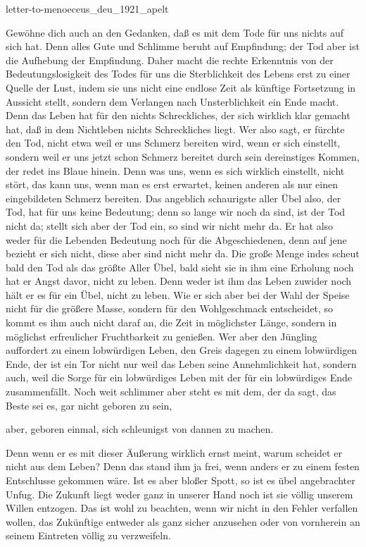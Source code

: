 \documentclass{stex}
\begin{document}
\begin{smodule}{letter-to-menoeceus_deu_1921_apelt}
\begin{sparagraph}[id=letter-to-menoeceus,name=Letter to Menoeceus]
  Gewöhne dich auch an den Gedanken, daß es mit dem Tode für uns nichts auf sich hat.
  Denn alles Gute und Schlimme beruht auf Empfindung; der Tod aber ist die Aufhebung der Empfindung.
  Daher macht die rechte Erkenntnis von der Bedeutungslosigkeit des Todes für uns die Sterblichkeit des Lebens erst zu einer Quelle der Lust, indem sie uns nicht eine endlose Zeit als künftige Fortsetzung in Aussicht stellt, sondern dem Verlangen nach Unsterblichkeit ein Ende macht.
  Denn das Leben hat für den nichts Schreckliches, der sich wirklich klar gemacht hat, daß in dem Nichtleben nichts Schreckliches liegt.
  Wer also sagt, er fürchte den Tod, nicht etwa weil er uns Schmerz bereiten wird, wenn er sich einstellt, sondern weil er uns jetzt schon Schmerz bereitet durch sein dereinstiges Kommen, der redet ins Blaue hinein.
  Denn was uns, wenn es sich wirklich einstellt, nicht stört, das kann uns, wenn man es erst erwartet, keinen anderen als nur einen eingebildeten Schmerz bereiten.
  Das angeblich schaurigste aller Übel also, der Tod, hat für uns keine Bedeutung; denn so lange wir noch da sind, ist der Tod nicht da; stellt sich aber der Tod ein, so sind wir nicht mehr da.
  Er hat also weder für die Lebenden Bedeutung noch für die Abgeschiedenen, denn auf jene bezieht er sich nicht, diese aber sind nicht mehr da.
  Die große Menge indes scheut bald den Tod als das größte Aller Übel, bald sieht sie in ihm eine Erholung  noch hat er Angst davor, nicht zu leben.
  Denn weder ist ihm das Leben zuwider noch hält er es für ein Übel, nicht zu leben.
  Wie er sich aber bei der Wahl der Speise nicht für die größere Masse, sondern für den Wohlgeschmack entscheidet, so kommt es ihm auch nicht daraf an, die Zeit in möglichster Länge, sondern in möglichst erfreulicher Fruchtbarkeit zu genießen.
  Wer aber den Jüngling auffordert zu einem lobwürdigen Leben, den Greis dagegen zu einem lobwürdigen Ende, der ist ein Tor nicht nur weil das Leben seine Annehmlichkeit hat, sondern auch, weil die Sorge für ein lobwürdiges Leben mit der für ein lobwürdiges Ende zusammenfällt.
  Noch weit schlimmer aber steht es mit dem, der da sagt, das Beste sei es, gar nicht geboren zu sein,
  \begin{displayquote}
    aber, geboren einmal, sich schleunigst von dannen zu machen.
  \end{displayquote}
  Denn wenn er es mit dieser Äußerung wirklich ernst meint, warum scheidet er nicht aus dem Leben?
  Denn das stand ihm ja frei, wenn anders er zu einem festen Entschlusse gekommen wäre.
  Ist es aber bloßer Spott, so ist es übel angebrachter Unfug.
  Die Zukunft liegt weder ganz in unserer Hand noch ist sie völlig unserem Willen entzogen.
  Das ist wohl zu beachten, wenn wir nicht in den Fehler verfallen wollen, das Zukünftige entweder als ganz sicher anzusehen oder von vornherein an seinem Eintreten völlig zu verzweifeln.


\end{sparagraph}
\end{smodule}
\end{document}
